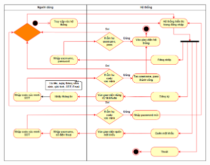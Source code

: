 \documentclass[a4paper,12pt]{article}
\begin{document}
\includegraphics[width=0.8\textwidth]{UCdangnhap2.png}

\clearpage
\end{document}
